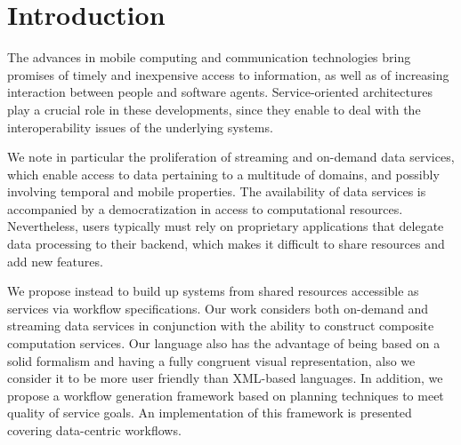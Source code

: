 	
\section{Introduction}\label{sec:asasel:intro}

The advances in mobile computing and communication technologies bring promises of timely and inexpensive access to information, as well as of increasing interaction between people and software agents. Service-oriented architectures play a crucial role in these developments, since they enable to deal with the interoperability issues of the underlying systems.

We note in particular the proliferation of streaming and on-demand data services, which enable access to data pertaining to a multitude of domains, and possibly involving temporal and mobile properties. The availability of data services is accompanied by a democratization in access to computational resources. Nevertheless, users typically must rely on proprietary applications that delegate data processing to their backend, which makes it difficult to share resources and add new features.	
	
We propose instead to build up systems from shared resources accessible as services via workflow specifications. Our work considers both on-demand and streaming data services in conjunction with the ability to construct composite computation services. Our language also has the advantage of being based on a solid formalism and having a fully congruent visual representation, also we consider it to be more user friendly than XML-based languages. In addition, we propose a workflow generation framework based on planning techniques to meet quality of service goals. An implementation of this framework is presented covering data-centric workflows.

